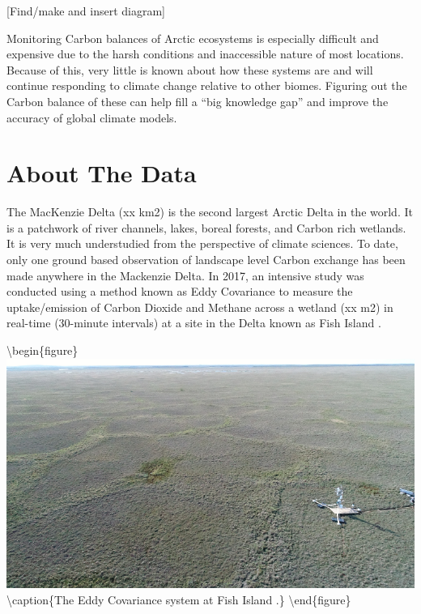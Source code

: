 \documentclass[
]{book}
\begin{document}
{[}Find/make and insert diagram{]}

Monitoring Carbon balances of Arctic ecosystems is especially difficult and expensive due to the harsh conditions and inaccessible nature of most locations. Because of this, very little is known about how these systems are and will continue responding to climate change relative to other biomes. Figuring out the Carbon balance of these can help fill a ``big knowledge gap'' and improve the accuracy of global climate models.

\hypertarget{about-the-data}{%
\section{About The Data}\label{about-the-data}}

The MacKenzie Delta (xx km2) is the second largest Arctic Delta in the world. It is a patchwork of river channels, lakes, boreal forests, and Carbon rich wetlands. It is very much understudied from the perspective of climate sciences. To date, only one ground based observation of landscape level Carbon exchange has been made anywhere in the Mackenzie Delta. In 2017, an intensive study was conducted using a method known as Eddy Covariance to measure the uptake/emission of Carbon Dioxide and Methane across a wetland (xx m2) in real-time (30-minute intervals) at a site in the Delta known as Fish Island \citep{skeeter_controls_2022}.

\textbackslash begin\{figure\}
\includegraphics[width=0.9\linewidth]{images/16-ec-site} \textbackslash caption\{The Eddy Covariance system at Fish Island \citep{skeeter_controls_2022}.\}\label{fig:16-ec-site}
\textbackslash end\{figure\}
\end{document}
